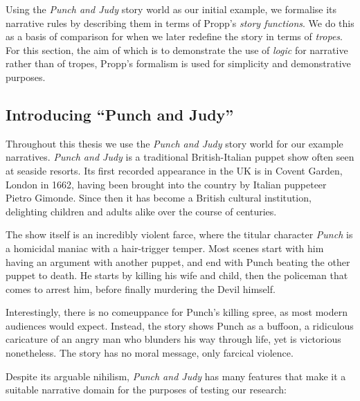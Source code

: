 \documentclass[11pt]{report}
\begin{document}
Using the \emph{Punch and Judy} story world as our initial example, we formalise
its narrative rules by describing them in terms of Propp's \emph{story
  functions}. We do this as a basis of comparison for when we later redefine the
story in terms of \emph{tropes}. For this section, the aim of which is to demonstrate the use of
\emph{logic} for narrative rather than of tropes, Propp's formalism is used for
simplicity and demonstrative purposes.

\subsection{Introducing ``Punch and Judy''}
Throughout this thesis we use the \emph{Punch and Judy} story world for our
example narratives. \emph{Punch and Judy} is a traditional British-Italian
puppet show often seen at seaside resorts. Its first recorded appearance in the
UK is in Covent Garden, London in 1662, having been brought into the country by
Italian puppeteer Pietro Gimonde. Since then it has become a British cultural
institution, delighting children and adults alike over the course of centuries.

The show itself is an incredibly violent farce, where the titular character
\emph{Punch} is a homicidal maniac with a hair-trigger temper. Most scenes start
with him having an argument with another puppet, and end with Punch beating the
other puppet to death. He starts by killing his wife and child, then the
policeman that comes to arrest him, before finally murdering the Devil himself.

Interestingly, there is no comeuppance for Punch's killing spree, as most modern
audiences would expect. Instead, the story shows Punch as a buffoon, a
ridiculous caricature of an angry man who blunders his way through life, yet is
victorious nonetheless. The story has no moral message, only farcical violence.

Despite its arguable nihilism, \emph{Punch and Judy} has many features that make
it a suitable narrative domain for the purposes of testing our research:
\end{document}
